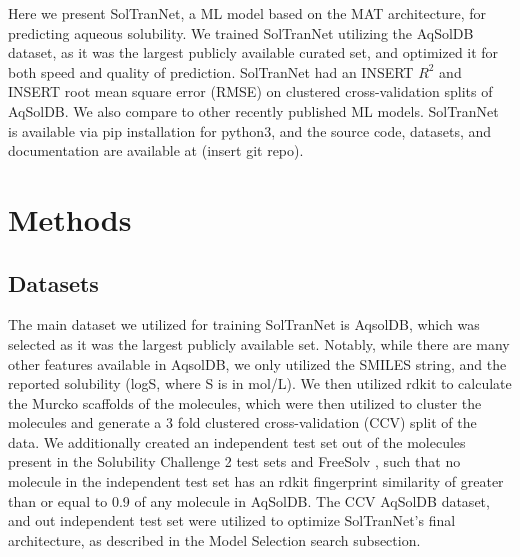 \documentclass[journal=jmcmar,manuscript=article]{achemso}
\begin{document}
Here we present SolTranNet, a ML model based on the MAT architecture, for predicting aqueous solubility.
We trained SolTranNet utilizing the AqSolDB dataset\cite{AqSol}, as it was the largest publicly available curated set, and optimized it for both speed and quality of prediction.
SolTranNet had an INSERT $R^2$ and INSERT root mean square error (RMSE) on clustered cross-validation splits of AqSolDB.
We also compare to other recently published ML models.\cite{lovric,cui,boobier,llinas}
SolTranNet is available via pip installation for python3, and the source code, datasets, and documentation are available at (insert git repo).


\section{Methods}

\subsection{Datasets}
The main dataset we utilized for training SolTranNet is AqsolDB\cite{AqSol}, which was selected as it was the largest publicly available set.
Notably, while there are many other features available in AqsolDB, we only utilized the SMILES string, and the reported solubility (logS, where S is in mol/L).
We then utilized rdkit\cite{rdkit} to calculate the Murcko scaffolds of the molecules, which were then utilized to cluster the molecules and generate a 3 fold clustered cross-validation (CCV) split of the data.
We additionally created an independent test set out of the molecules present in the Solubility Challenge 2 test sets \cite{llinas} and FreeSolv \cite{freesolv}, such that no molecule in the independent test set has an rdkit fingerprint similarity of greater than or equal to 0.9 of any molecule in AqSolDB.
The CCV AqSolDB dataset, and out independent test set were utilized to optimize SolTranNet's final architecture, as described in the Model Selection search subsection.
\end{document}
